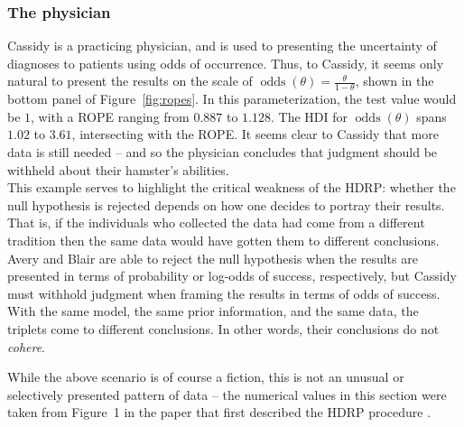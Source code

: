 \documentclass[9pt,twocolumn,twoside]{cidlab-draft}\templatetype{cidlab-invited}
\newcommand{\hdr}{HDRP}
\DeclareMathOperator*{\oddss}{odds}
\begin{document}
\subsubsection{The physician}
Cassidy is a practicing physician, and is used to presenting the uncertainty of diagnoses to patients using odds of occurrence. Thus, to Cassidy, it seems only natural to present the results on the scale of $\oddss(\theta)=\frac{\theta}{1-\theta}$, shown in the bottom panel of Figure~\ref{fig:ropes}. In this parameterization, the test value would be $1$, with a ROPE ranging from $0.887$ to $1.128$. The HDI for $\oddss(\theta)$ spans $1.02$ to $3.61$, intersecting with the ROPE.  
It seems clear to Cassidy that more data is still needed -- and so the physician concludes that judgment should be withheld about their hamster's abilities.\\

\noindent This example serves to highlight the critical weakness of the \hdr{}: whether the null hypothesis is rejected depends on how one decides to portray their results.  That is, if the individuals who collected the data had come from a different tradition then the same data would have gotten them to different conclusions. Avery and Blair are able to reject the null hypothesis when the results are presented in terms of probability or log-odds of success, respectively, but Cassidy must withhold judgment when framing the results in terms of odds of success.  With the same model, the same prior information, and the same data, the triplets come to different conclusions. In other words, their conclusions do not \textit{cohere}. 

While the above scenario is of course a fiction, this is not an unusual or selectively presented pattern of data -- the numerical values in this section were taken from Figure~1 in the paper that first described the \hdr{} procedure \cite{Kruschke2011}.
\end{document}
